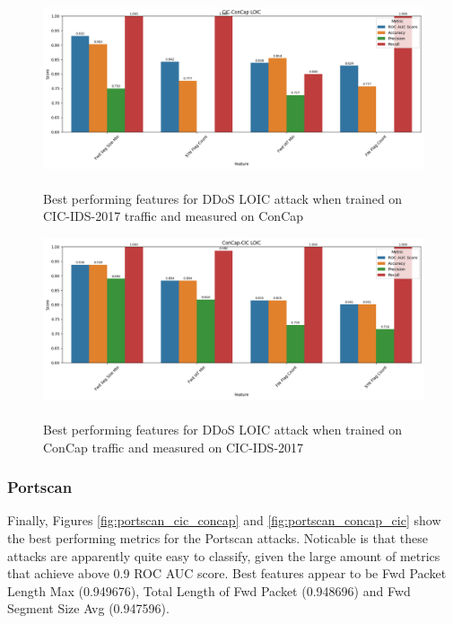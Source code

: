 \begin{figure}
	\centering
	\includegraphics[width=1.2\linewidth]{images/loic_cic_concap}
	\caption{\\Best performing features for DDoS LOIC attack when trained on CIC-IDS-2017 traffic and measured on ConCap}
	\label{fig:loic_cic_concap}
\end{figure}
\begin{figure}
	\centering
	\includegraphics[width=1.2\linewidth]{images/loic_concap_cic}
	\caption{\\Best performing features for DDoS LOIC attack when trained on ConCap traffic and measured on CIC-IDS-2017}
	\label{fig:loic_concap_cic}
\end{figure}

\subsubsection{Portscan}
Finally, Figures \ref{fig:portscan_cic_concap} and \ref{fig:portscan_concap_cic} show the best performing metrics for the Portscan attacks. Noticable is that these attacks are apparently quite easy to classify, given the large amount of metrics that achieve above 0.9 ROC AUC score. Best features appear to be Fwd Packet Length Max (0.949676), Total Length of Fwd Packet (0.948696) and Fwd Segment Size Avg (0.947596). 


